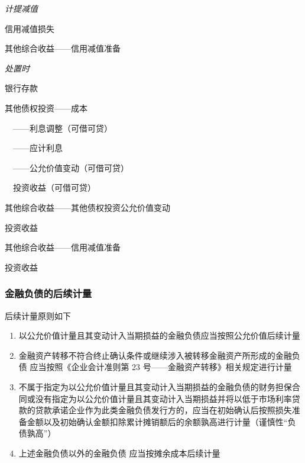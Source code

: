 \documentclass[UTF8,12pt]{ctexart}
\newenvironment{Dr}{%
	\begin{list}{}%
		{
			\setlength{\leftmargin}{2em}
			\setlength{\labelwidth}{2em}
			\setlength{\labelsep}{0pt}
			\setlength{\itemindent}{0pt}
			\setlength{\listparindent}{0pt}
			\setlength{\parsep}{0pt}
			\setlength{\topsep}{0pt}
		}
		\item[\textbf{借：}]
	}{%
	\end{list}
}
\newenvironment{Cr}{%
	\begin{list}{}%
		{
			\setlength{\leftmargin}{2em}
			\setlength{\labelwidth}{2em}
			\setlength{\labelsep}{0pt}
			\setlength{\itemindent}{0pt}
			\setlength{\listparindent}{0pt}
			\setlength{\parsep}{0pt}
			\setlength{\topsep}{0pt}
		}
		\item[\textbf{贷：}]
	}{%
	\end{list}
}
\numberwithin{equation}{section} %
\numberwithin{figure}{section}
\numberwithin{table}{section}
\begin{document}
	
	\textit{计提减值}
	
	\begin{Dr}
		信用减值损失
	\end{Dr}
	\begin{Cr}
		其他综合收益——信用减值准备
	\end{Cr}

	
	\textit{处置时}
	
	\begin{Dr}
		银行存款
	\end{Dr}
	\begin{Cr}
		其他债权投资——成本
		
		\ \ ——利息调整（可借可贷）
		
		\ \ ——应计利息
		
		\ \ ——公允价值变动（可借可贷） 
		
		\ \ 投资收益（可借可贷）
	\end{Cr}

	\begin{Dr}
		其他综合收益——其他债权投资公允价值变动
	\end{Dr}
	\begin{Cr}
		投资收益
	\end{Cr}
	
	\begin{Dr}
		其他综合收益——信用减值准备
	\end{Dr}
	\begin{Cr}
		投资收益
	\end{Cr}
	
	
	
	
	
	\subsubsection{金融负债的后续计量}
	后续计量原则如下
	\begin{enumerate}
		\item 以公允价值计量且其变动计入当期损益的金融负债应当按照公允价值后续计量
		
		\item 金融资产转移不符合终止确认条件或继续涉入被转移金融资产所形成的金融负债	应当按照《企业会计准则第 23 号——金融资产转移》相关规定进行计量
		
		\item 不属于指定为以公允价值计量且其变动计入当期损益的金融负债的财务担保合同或没有指定为以公允价值计量且其变动计入当期损益并将以低于市场利率贷款的贷款承诺企业作为此类金融负债发行方的，应当在初始确认后按照损失准备金额以及初始确认金额扣除累计摊销额后的余额孰高进行计量（谨慎性“负债孰高”）
		
		\item 上述金融负债以外的金融负债	应当按摊余成本后续计量
	\end{enumerate}
	
\end{document}
